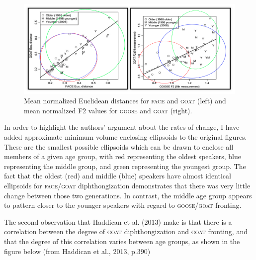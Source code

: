 \documentclass{article}
\begin{document}
\begin{figure}[ht!]
\hspace{-1.5cm}
\includegraphics[scale=0.6]{D_lawrence_fronting_and_diphthongization.png}
\caption{Mean normalized Euclidean distances for \textsc{face} and \textsc{goat} (left) and mean normalized F2 values for \textsc{goose} and \textsc{goat} (right).}
\end{figure}

In order to highlight the authors' argument about the rates of change, I have added approximate minimum volume enclosing ellipsoids to the original figures. These are the smallest possible ellipsoids which can be drawn to enclose all members of a given age group, with red representing the oldest speakers, blue representing the middle group, and green representing the youngest group. The fact that the oldest (red) and middle (blue) speakers have almost identical ellipsoids for \textsc{face}/\textsc{goat} diphthongization demonstrates that there was very little change between those two generations. In contrast, the middle age group appears to pattern closer to the younger speakers with regard to \textsc{goose}/\textsc{goat} fronting.

The second observation that Haddican et al. (2013) make is that there is a correlation between the degree of \textsc{goat} diphthongization and \textsc{goat} fronting, and that the degree of this correlation varies between age groups, as shown in the figure below (from Haddican et al., 2013, p.390)
\end{document}

